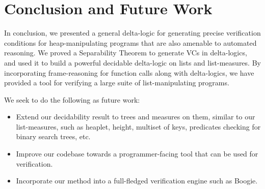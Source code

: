 \section{Conclusion and Future Work}
\label{sec:conclusion}
In conclusion, we presented a general delta-logic for generating precise verification conditions for heap-manipulating programs that are also amenable to automated reasoning. We proved a Separability Theorem to generate VCs in delta-logics, and used it to build a powerful decidable delta-logic on lists and list-measures. By incorporating frame-reasoning for function calls along with delta-logics, we have provided a tool for verifying a large suite of list-manipulating programs.

We seek to do the following as future work:
\begin{itemize}
\item Extend our decidability result to trees and measures on them, similar to our list-measures, such as heaplet, height, multiset of keys, predicates checking for binary search trees, etc.

\item Improve our codebase towards a programmer-facing tool that can be used for verification.

\item Incorporate our method into a full-fledged verification engine such as Boogie.
\end{itemize}
